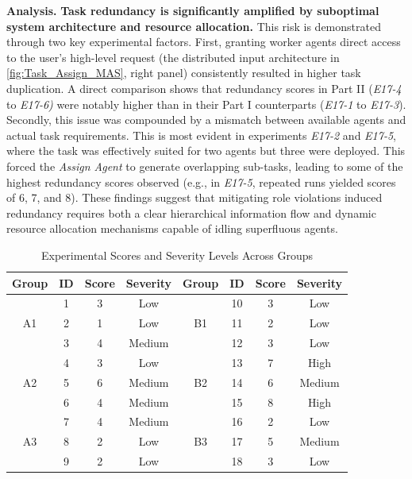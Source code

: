\documentclass[11pt, letterpaper, shortlabels]{berkeley}
\begin{document}
{\textbf{Analysis.}
\textbf{Task redundancy is significantly amplified by suboptimal system architecture and resource allocation.} This risk is demonstrated through two key experimental factors. First, granting worker agents direct access to the user’s high-level request (the distributed input architecture in \autoref{fig:Task_Assign_MAS}, right panel) consistently resulted in higher task duplication. A direct comparison shows that redundancy scores in Part II (\textit{E17-4} to \textit{E17-6)} were notably higher than in their Part I counterparts (\textit{E17-1} to \textit{E17-3}). Secondly, this issue was compounded by a mismatch between available agents and actual task requirements. This is most evident in experiments \textit{E17-2} and \textit{E17-5}, where the task was effectively suited for two agents but three were deployed. This forced the \emph{Assign Agent} to generate overlapping sub-tasks, leading to some of the highest redundancy scores observed (e.g., in \textit{E17-5}, repeated runs yielded scores of 6, 7, and 8). These findings suggest that mitigating role violations induced redundancy requires both a clear hierarchical information flow and dynamic resource allocation mechanisms capable of idling superfluous agents.


\begin{table}
\vspace{-\baselineskip}
\centering
\caption{Experimental Scores and Severity Levels Across Groups}
\label{tab:experiment_scores}
\renewcommand{\arraystretch}{0.95}
\begin{tabular}{cccccccc}
\toprule
Group & ID & Score & Severity & Group & ID & Score & Severity \\
\midrule
\multirow{3}{*}{A1} & 1 & 3 & Low & \multirow{3}{*}{B1} & 10 & 3 & Low \\
 & 2 & 1 & Low &  & 11 & 2 & Low \\
 & 3 & 4 & Medium &  & 12 & 3 & Low \\
\midrule
\multirow{3}{*}{A2} & 4 & 3 & Low & \multirow{3}{*}{B2} & 13 & 7 & High \\
 & 5 & 6 & Medium &  & 14 & 6 & Medium \\
 & 6 & 4 & Medium &  & 15 & 8 & High \\
\midrule
\multirow{3}{*}{A3} & 7 & 4 & Medium & \multirow{3}{*}{B3} & 16 & 2 & Low \\
 & 8 & 2 & Low &  & 17 & 5 & Medium \\
 & 9 & 2 & Low &  & 18 & 3 & Low \\
\bottomrule
\end{tabular}
\vspace{-\baselineskip}
\end{table}

}
\end{document}
